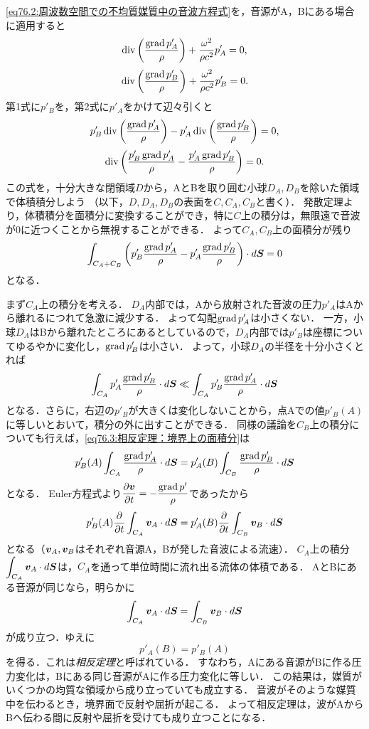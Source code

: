 \eqref{eq76.2:周波数空間での不均質媒質中の音波方程式}を，音源がA，Bにある場合に適用すると
\[
    \operatorname{div} \left( \frac{\operatorname{grad} p'_A}{\rho} \right) + \frac{\omega^2}{\rho c^2} p'_A = 0 ,
\]
\[
    \operatorname{div} \left( \frac{\operatorname{grad} p'_B}{\rho} \right) + \frac{\omega^2}{\rho c^2} p'_B = 0 .
\]
第1式に$p'_B$を，第2式に$p'_A$をかけて辺々引くと
\[
    p'_B \operatorname{div} \left( \frac{\operatorname{grad} p'_A}{\rho} \right) - p'_A \operatorname{div} \left( \frac{\operatorname{grad} p'_B}{\rho} \right) = 0,
\]
\[
    \operatorname{div} \left( \frac{p'_B \operatorname{grad} p'_A}{\rho} - \frac{p'_A \operatorname{grad} p'_B}{\rho} \right) = 0.
\]
この式を，十分大きな閉領域$D$から，AとBを取り囲む小球$D_A,D_B$を除いた領域で体積積分しよう
（以下，$D,D_A,D_B$の表面を$C,C_A,C_B$と書く）．
発散定理より，体積積分を面積分に変換することができ，特に$C$上の積分は，無限遠で音波が0に近つくことから無視することができる．
よって$C_A,C_B$上の面積分が残り
\begin{equation}\label{eq76.3:相反定理：境界上の面積分}
    \int_{C_A+C_B} \left( p'_B \frac{\operatorname{grad} p'_A}{\rho} - p'_A \frac{\operatorname{grad} p'_B}{\rho} \right) \cdot d\vb*{S} = 0
\end{equation}
となる．


まず$C_A$上の積分を考える．
$D_A$内部では，Aから放射された音波の圧力$p'_A$はAから離れるにつれて急激に減少する．
よって勾配$\operatorname{grad} p'_A$は小さくない．
一方，小球$D_A$はBから離れたところにあるとしているので，$D_A$内部では$p'_B$は座標についてゆるやかに変化し，$\operatorname{grad} p'_B$は小さい．
よって，小球$D_A$の半径を十分小さくとれば
\[
    \int_{C_A} p'_A \frac{\operatorname{grad} p'_B}{\rho} \cdot d\vb*{S}
    \ll \int_{C_A} p'_B \frac{\operatorname{grad} p'_A}{\rho} \cdot d\vb*{S}
\]
となる．さらに，右辺の$p'_B$が大きくは変化しないことから，点Aでの値$p'_B(A)$に等しいとおいて，積分の外に出すことができる．
同様の議論を$C_B$上の積分についても行えば，\eqref{eq76.3:相反定理：境界上の面積分}は
\[
    p'_B(A) \int_{C_A} \frac{\operatorname{grad} p'_A}{\rho} \cdot d\vb*{S} = p'_A(B) \int_{C_B} \frac{\operatorname{grad} p'_B}{\rho} \cdot d\vb*{S}
\]
となる．
Euler方程式より$\dpdv{\v}{t} = - \dfrac{\Grad p'}{\rho}$であったから
\[
    p'_B(A) \pdv{t} \int_{C_A} \vb*{v}_A \cdot d\vb*{S} = p'_A(B) \pdv{t} \int_{C_B} \vb*{v}_B \cdot d\vb*{S}
\]
となる（$\vb*{v}_A,\vb*{v}_B$はそれぞれ音源A，Bが発した音波による流速）．
$C_A$上の積分$\displaystyle\int_{C_A} \vb*{v}_A \cdot d\vb*{S}$は，$C_A$を通って単位時間に流れ出る流体の体積である．
AとBにある音源が同じなら，明らかに
\[
    \int_{C_A} \vb*{v}_A \cdot d\vb*{S} = \int_{C_B} \vb*{v}_B \cdot d\vb*{S}
\]
が成り立つ．ゆえに
\begin{equation}
    p'_A(B) = p'_B(A)
\end{equation}
を得る．これは\emph{相反定理}と呼ばれている．
すなわち，Aにある音源がBに作る圧力変化は，Bにある同じ音源がAに作る圧力変化に等しい．
この結果は，媒質がいくつかの均質な領域から成り立っていても成立する．
音波がそのような媒質中を伝わるとき，境界面で反射や屈折が起こる．
よって相反定理は，波がAからBへ伝わる間に反射や屈折を受けても成り立つことになる．






\BackToTheToc